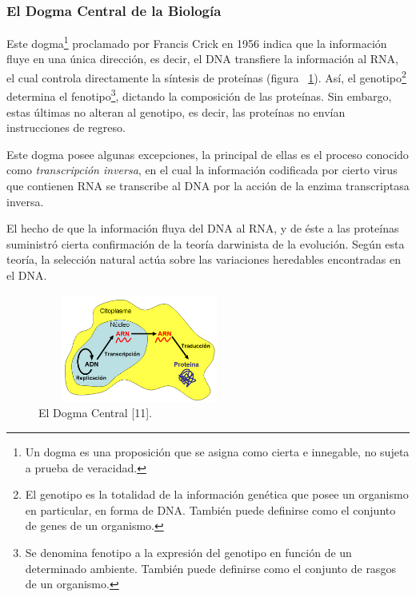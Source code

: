 \subsubsection{El Dogma Central de la Biología}
\par Este dogma\footnote{Un dogma es una proposición que se asigna como cierta e innegable, no sujeta a prueba de veracidad.} proclamado por Francis Crick en 1956 indica que la información fluye en una única dirección, es decir, el DNA transfiere la información al RNA, el cual controla directamente la síntesis de proteínas (figura ~\ref{dogma}). Así, el genotipo\footnote{El genotipo es la totalidad de la información genética que posee un organismo en particular, en forma de DNA. También puede definirse como el conjunto de genes de un organismo.} determina el fenotipo\footnote{Se denomina fenotipo a la expresión del genotipo en función de un determinado ambiente. También puede definirse como el conjunto de rasgos de un organismo.}, dictando la composición de las proteínas. Sin embargo, estas últimas no alteran al genotipo, es decir, las proteínas no envían instrucciones de regreso. 
\par Este dogma posee algunas excepciones, la principal de ellas es el proceso conocido como \textit{transcripción inversa}, en el cual la información codificada por cierto virus que contienen RNA se transcribe al DNA por la acción de la enzima transcriptasa inversa. 
\par El hecho de que la información fluya del DNA al RNA, y de éste a las proteínas suministró cierta confirmación de la teoría darwinista de la evolución. Según esta teoría, la selección natural actúa sobre las variaciones heredables encontradas en el DNA\cite{curtis}.



\begin{figure} [h]
	\hspace*{3cm}\includegraphics[width=2.6209in,height=1.4000in]{image/rel.png} %
	\caption{El Dogma Central [11].}	
	\label{dogma}
\end{figure}				


